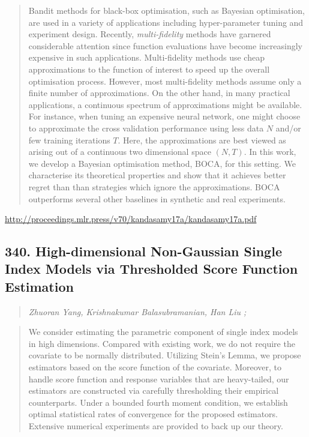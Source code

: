 \documentclass{article}
\begin{document}
\begin{quote}
    Bandit methods for black-box optimisation, such as Bayesian optimisation, are used in a variety of applications including hyper-parameter tuning and experiment design. Recently, \textit{multi-fidelity} methods have garnered considerable attention since function evaluations have become increasingly expensive in such applications. Multi-fidelity methods use cheap approximations to the function of interest to speed up the overall optimisation process. However, most multi-fidelity methods assume only a finite number of approximations. On the other hand, in many practical applications, a continuous spectrum of approximations might be available. For instance, when tuning an expensive neural network, one might choose to approximate the cross validation performance using less data $N$ and/or few training iterations $T$. Here, the approximations are best viewed as arising out of a continuous two dimensional space $(N,T)$. In this work, we develop a Bayesian optimisation method, BOCA, for this setting. We characterise its theoretical properties and show that it achieves better regret than than strategies which ignore the approximations. BOCA outperforms several other baselines in synthetic and real experiments.  \end{quote}

\href{http://proceedings.mlr.press/v70/kandasamy17a/kandasamy17a.pdf}{http://proceedings.mlr.press/v70/kandasamy17a/kandasamy17a.pdf}

\subsection{340. High-dimensional Non-Gaussian Single Index Models via Thresholded Score Function Estimation}

\begin{quote}
\footnotesize{\textit{Zhuoran Yang, Krishnakumar Balasubramanian, Han Liu ;}}
\end{quote}

\begin{quote}
    We consider estimating the parametric component of single index models in high dimensions. Compared with existing work, we do not require the covariate to be normally distributed. Utilizing Stein’s Lemma, we propose estimators based on the score function of the covariate. Moreover, to handle score function and response variables that are heavy-tailed, our estimators are constructed via carefully thresholding their empirical counterparts. Under a bounded fourth moment condition, we establish optimal statistical rates of convergence for the proposed estimators. Extensive numerical experiments are provided to back up our theory.  \end{quote}
\end{document}
